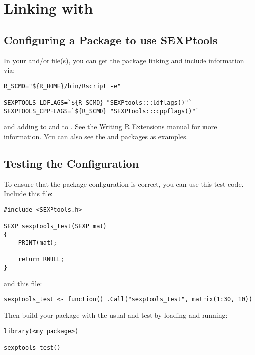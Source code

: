 \section{Linking with \thispackage}\label{linking}

\subsection{Configuring a Package to use SEXPtools}
In your  and/or  file(s), you can get the 
package linking and include information via:
\begin{lstlisting}
R_SCMD="${R_HOME}/bin/Rscript -e"
 
SEXPTOOLS_LDFLAGS=`${R_SCMD} "SEXPtools:::ldflags()"`
SEXPTOOLS_CPPFLAGS=`${R_SCMD} "SEXPtools:::cppflags()"`
\end{lstlisting}

and adding  to  and 
 to .  See the
\href{http://cran.r-project.org/doc/manuals/R-exts.html#Configure-and-cleanup
}{Writing R Extensions} manual for more information.  You can also see the 
 and  packages as examples.



\subsection{Testing the Configuration}

To ensure that the package configuration is correct, you can use this test 
code.  Include this  file:
\begin{lstlisting}[title=sexptools\_test.c]
#include <SEXPtools.h>

SEXP sexptools_test(SEXP mat)
{
	PRINT(mat);
	
	return RNULL;
}
\end{lstlisting}

and this  file:
\begin{lstlisting}[language=rr,title=sexptools\_test.r]
sexptools_test <- function() .Call("sexptools_test", matrix(1:30, 10))
\end{lstlisting}

Then build your package with the usual  and test by loading 
 and running:
\begin{lstlisting}[language=rr]
library(<my package>)

sexptools_test()
\end{lstlisting}
